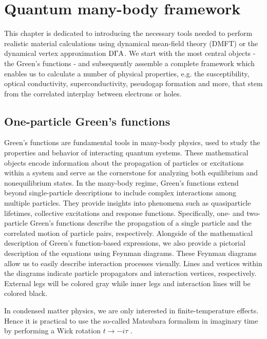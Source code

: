 \documentclass[\main/main.tex]{subfiles}
\begin{document}
\chapter{Quantum many-body framework}

This chapter is dedicated to introducing the necessary tools needed to perform realistic material calculations using dynamical mean-field theory (DMFT) or the dynamical vertex approximation $\text{D}\Gamma\text{A}$. We start with the most central objects - the Green's functions - and subsequently assemble a complete framework which enables us to calculate a number of physical properties, e.g. the susceptibility, optical conductivity, superconductivity, pseudogap formation and more, that stem from the correlated interplay between electrons or holes. 

\section{One-particle Green's functions}

Green's functions are fundamental tools in many-body physics, used to study the properties and behavior of interacting quantum systems. These mathematical objects encode information about the propagation of particles or excitations within a system and serve as the cornerstone for analyzing both equilibrium and nonequilibrium states. In the many-body regime, Green's functions extend beyond single-particle descriptions to include complex interactions among multiple particles. They provide insights into phenomena such as quasiparticle lifetimes, collective excitations and response functions. Specifically, one- and two-particle Green's functions describe the propagation of a single particle and the correlated motion of particle pairs, respectively. Alongside of the mathematical description of Green's function-based expressions, we also provide a pictorial description of the equations using Feynman diagrams. These Feynman diagrams allow us to easily describe interaction processes visually. Lines and vertices within the diagrams indicate particle propagators and interaction vertices, respectively. External legs will be colored gray while inner legs and interaction lines will be colored black.

In condensed matter physics, we are only interested in finite-temperature effects. Hence it is practical to use the so-called Matsubara formalism \cite{Matsubara1955} in imaginary time by performing a Wick rotation $t\to -i\tau$ \cite{Wick1954}.
\end{document}
